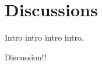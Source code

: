 \chapter{Discussions}
\begin{chapabstract}

Intro intro intro intro.

\end{chapabstract}

Discussion!!
